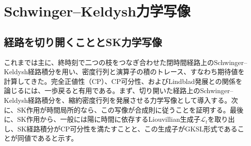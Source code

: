 \documentclass[a4paper,11pt,oneside]{article}
\theoremstyle{definition}
\numberwithin{equation}{section}
\renewcommand{\L}{\mathcal{L}}
\begin{document}
 

\section{Schwinger--Keldysh力学写像}\label{sec:SKmap}






\subsection{経路を切り開くこととSK力学写像}



これまでは主に、終時刻で二つの枝をつなぎ合わせた閉時間経路上のSchwinger--Keldysh経路積分を用い、密度行列と演算子の積のトレース、すなわち期待値を計算してきた。完全正値性（CP）、CP可分性、およびLindblad発展との関係を論じるには、一歩戻ると有用である。まず、切り開いた経路上のSchwinger--Keldysh経路積分を、縮約密度行列を発展させる力学写像として導入する。次に、SK作用が時間局所的なら、この写像が合成則に従うことを証明する。最後に、SK作用から、一般には陽に時間に依存するLiouvillian生成子$  \L_{t} $を取り出し、SK経路積分がCP可分性を満たすことと、この生成子がGKSL形式であることが同値であると示す。\\
\end{document}
